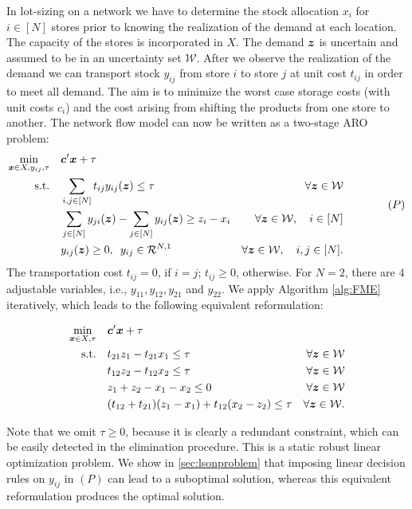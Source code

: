 \documentclass[fleqn,orsc,blindrev]{informs4}
\newcommand{\mb}[1]{\mbox{\boldmath \ensuremath{#1}}}
\begin{document}
	\begin{example}  \label{exmp:lson}
		In lot-sizing on a network we have to determine the stock allocation $x_i$ for $i\in [N]$ stores prior to knowing the realization of the demand at each location. The capacity of the stores is incorporated in $X$. The demand $\mb{z}$ is uncertain and assumed to be in an uncertainty set $\mathcal{W}$. After we observe the realization of the demand we can transport stock $y_{ij}$ from store $i$ to store $j$ at unit cost $t_{ij}$ in order to meet all demand. The aim is to minimize the worst case storage costs (with unit costs $c_i$) and the cost arising from shifting the products from one store to another. The network flow model can now be written as a two-stage ARO problem:
\begin{equation*}
\begin{aligned} 
				\min_{ \boldsymbol{x} \in X, y_{ij}, \tau} \quad &  \mb{c}'\mb{x} + \tau \\
				{\rm s.t.}  \quad & \sum_{i,j\in [N]} t_{ij}y_{ij}(\mb{z}) \le \tau & \forall \mb{z} \in \mathcal{W} \\
				\quad & \sum_{j \in [N]} y_{ji}(\mb{z}) - \sum_{j \in [N]} y_{ij}(\mb{z}) \ge z_i - x_i   & \forall \mb{z} \in \mathcal{W}, \quad i \in [N]\\
				\quad & y_{ij}(\mb{z}) \ge 0, \,\,\,  y_{ij} \in \mathcal{R}^{N,1} & \forall \mb{z} \in \mathcal{W}, \quad i,j \in [N].
			\end{aligned} \qquad \qquad (P)
\end{equation*}
The transportation cost $t_{ij}= 0$, if $i= j$; $t_{ij} \ge 0$,  otherwise. For $N=2$, there are $4$ adjustable variables, i.e.,  $y_{11},  y_{12}, y_{21}$  and $y_{22}$. We apply Algorithm \ref{alg:FME} iteratively, which leads to the following equivalent reformulation:
\begin{minipage}{\textwidth}
\begin{align*}
			\min_{ \boldsymbol{x} \in X, \tau} \quad &  \mb{c}'\mb{x} + \tau \\
			{\rm s.t.}  \quad & t_{21}z_1 - t_{21}x_1 \le \tau & \forall \mb{z} \in \mathcal{W} \\
			\quad & t_{12}z_2 - t_{12}x_2 \le \tau & \forall \mb{z} \in \mathcal{W} \\
			\quad & z_1 + z_2 - x_1 - x_2  \le 0 & \forall \mb{z} \in \mathcal{W} \\
			\quad & (t_{12} + t_{21})(z_1-x_1) + t_{12}(x_2 - z_2) \le \tau & \forall \mb{z} \in \mathcal{W}.\\
\end{align*}
		\end{minipage}		
		Note that we omit $\tau \ge 0$, because it is clearly a redundant constraint, which can be easily detected in the elimination procedure. This is a static robust linear optimization problem. We show in \textsection \ref{sec:lsonproblem} that imposing linear decision rules on $ y_{ij}$ in $(P)$ can lead to a suboptimal solution, whereas this equivalent reformulation produces the optimal solution.   \hfill \Halmos
	\end{example}
	
\end{document}
